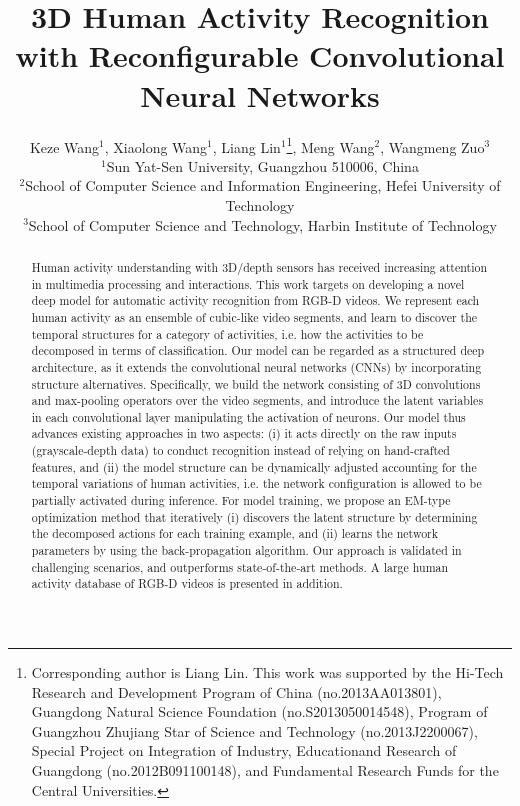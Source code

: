 \documentclass{sig-alternate}
\begin{document}
\title{3D Human Activity Recognition with Reconfigurable Convolutional Neural Networks}
\author{
\alignauthor
    Keze Wang$^{1}$, Xiaolong Wang$^{1}$, Liang Lin$^{1}$\thanks{Corresponding author is Liang Lin. This work 
was supported by the Hi-Tech Research and Development Program of China (no.2013AA013801), Guangdong Natural Science Foundation (no.S2013050014548), Program of Guangzhou Zhujiang Star of Science and Technology (no.2013J2200067), Special Project on Integration of Industry, Educationand Research of Guangdong (no.2012B091100148), and Fundamental Research Funds for the Central Universities.}, Meng Wang$^{2}$, Wangmeng Zuo$^{3}$\\
\affaddr
   $^1$Sun Yat-Sen University, Guangzhou 510006, China\\
   $^2$School of Computer Science and Information Engineering, Hefei University of Technology\\
   $^3$School of Computer Science and Technology, Harbin Institute of Technology\\
}


\maketitle
\begin{abstract}
Human activity understanding with 3D/depth sensors has received increasing attention in multimedia processing and interactions. This work targets on developing a novel deep model for automatic activity recognition from RGB-D videos. We represent each human activity as an ensemble of cubic-like video segments, and learn to discover the temporal structures for a category of activities, i.e. how the activities to be decomposed in terms of classification. Our model can be regarded as a structured deep architecture, as it extends the convolutional neural networks (CNNs) by incorporating structure alternatives. Specifically, we build the network consisting of 3D convolutions and max-pooling operators over the video segments, and introduce the latent variables in each convolutional layer manipulating the activation of neurons. Our model thus advances existing approaches in two aspects: (i) it acts directly on the raw inputs (grayscale-depth data) to conduct recognition instead of relying on hand-crafted features, and (ii) the model structure can be dynamically adjusted accounting for the temporal variations of human activities, i.e. the network configuration is allowed to be partially activated during inference. For model training, we propose an EM-type optimization method that iteratively (i) discovers the latent structure by determining the decomposed actions for each training example, and (ii) learns the network parameters by using the back-propagation algorithm.  Our approach is validated in challenging scenarios, and outperforms state-of-the-art methods. A large human activity database of RGB-D videos is presented in addition.
\end{abstract}
\vspace{-4mm}
\end{document}
